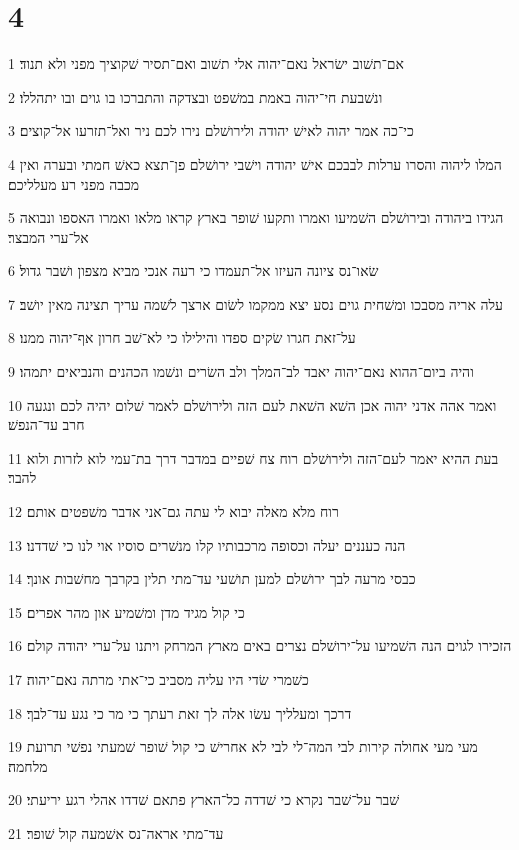 \chapter{4}

\par 1 אם־תשׁוב ישׂראל נאם־יהוה אלי תשׁוב ואם־תסיר שׁקוציך מפני ולא תנוד׃
\par 2 ונשׁבעת חי־יהוה באמת במשׁפט ובצדקה והתברכו בו גוים ובו יתהללו׃
\par 3 כי־כה אמר יהוה לאישׁ יהודה ולירושׁלם נירו לכם ניר ואל־תזרעו אל־קוצים׃
\par 4 המלו ליהוה והסרו ערלות לבבכם אישׁ יהודה וישׁבי ירושׁלם פן־תצא כאשׁ חמתי ובערה ואין מכבה מפני רע מעלליכם׃
\par 5 הגידו ביהודה ובירושׁלם השׁמיעו ואמרו ותקעו שׁופר בארץ קראו מלאו ואמרו האספו ונבואה אל־ערי המבצר׃
\par 6 שׂאו־נס ציונה העיזו אל־תעמדו כי רעה אנכי מביא מצפון ושׁבר גדול׃
\par 7 עלה אריה מסבכו ומשׁחית גוים נסע יצא ממקמו לשׂום ארצך לשׁמה עריך תצינה מאין יושׁב׃
\par 8 על־זאת חגרו שׂקים ספדו והילילו כי לא־שׁב חרון אף־יהוה ממנו׃
\par 9 והיה ביום־ההוא נאם־יהוה יאבד לב־המלך ולב השׂרים ונשׁמו הכהנים והנביאים יתמהו׃
\par 10 ואמר אהה אדני יהוה אכן השׁא השׁאת לעם הזה ולירושׁלם לאמר שׁלום יהיה לכם ונגעה חרב עד־הנפשׁ׃
\par 11 בעת ההיא יאמר לעם־הזה ולירושׁלם רוח צח שׁפיים במדבר דרך בת־עמי לוא לזרות ולוא להבר׃
\par 12 רוח מלא מאלה יבוא לי עתה גם־אני אדבר משׁפטים אותם׃
\par 13 הנה כעננים יעלה וכסופה מרכבותיו קלו מנשׁרים סוסיו אוי לנו כי שׁדדנו׃
\par 14 כבסי מרעה לבך ירושׁלם למען תושׁעי עד־מתי תלין בקרבך מחשׁבות אונך׃
\par 15 כי קול מגיד מדן ומשׁמיע און מהר אפרים׃
\par 16 הזכירו לגוים הנה השׁמיעו על־ירושׁלם נצרים באים מארץ המרחק ויתנו על־ערי יהודה קולם׃
\par 17 כשׁמרי שׂדי היו עליה מסביב כי־אתי מרתה נאם־יהוה׃
\par 18 דרכך ומעלליך עשׂו אלה לך זאת רעתך כי מר כי נגע עד־לבך׃
\par 19 מעי מעי אחולה קירות לבי המה־לי לבי לא אחרישׁ כי קול שׁופר שׁמעתי נפשׁי תרועת מלחמה׃
\par 20 שׁבר על־שׁבר נקרא כי שׁדדה כל־הארץ פתאם שׁדדו אהלי רגע יריעתי׃
\par 21 עד־מתי אראה־נס אשׁמעה קול שׁופר׃
